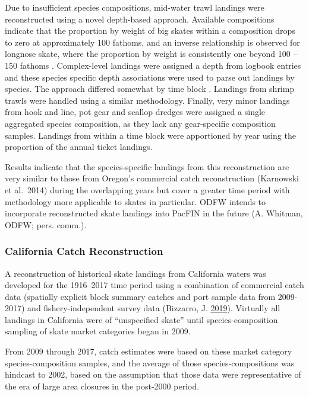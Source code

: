 \documentclass[12pt,]{article}
\begin{document}
Due to insufficient species compositions, mid-water trawl landings were
reconstructed using a novel depth-based approach. Available compositions
indicate that the proportion by weight of big skates within a
composition drops to zero at approximately 100 fathoms, and an inverse
relationship is observed for longnose skate, where the proportion by
weight is consistently one beyond 100 -- 150 fathoms . Complex-level
landings were assigned a depth from logbook entries and these species
specific depth associations were used to parse out landings by species.
The approach differed somewhat by time block . Landings from shrimp
trawls were handled using a similar methodology. Finally, very minor
landings from hook and line, pot gear and scallop dredges were assigned
a single aggregated species composition, as they lack any gear-specific
composition samples. Landings from within a time block were apportioned
by year using the proportion of the annual ticket landings.

Results indicate that the species-specific landings from this
reconstruction are very similar to those from Oregon's commercial catch
reconstruction (Karnowski et al.~2014) during the overlapping years but
cover a greater time period with methodology more applicable to skates
in particular. ODFW intends to incorporate reconstructed skate landings
into PacFIN in the future (A. Whitman, ODFW; pers. comm.).

\hypertarget{california-catch-reconstruction}{%
\subsubsection{California Catch
Reconstruction}\label{california-catch-reconstruction}}

A reconstruction of historical skate landings from California waters was
developed for the 1916--2017 time period using a combination of
commercial catch data (spatially explicit block summary catches and port
sample data from 2009-2017) and fishery-independent survey data
(Bizzarro, J. \protect\hyperlink{ref-Bizzarro2019}{2019}). Virtually all
landings in California were of ``unspecified skate'' until
species-composition sampling of skate market categories began in 2009.

From 2009 through 2017, catch estimates were based on these market
category species-composition samples, and the average of those
species-compositions was hindcast to 2002, based on the assumption that
those data were representative of the era of large area closures in the
post-2000 period.
\end{document}
